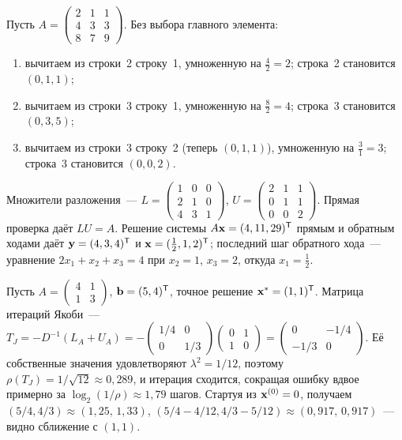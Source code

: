 \begin{example}
\label{ex:lu-3x3}
Пусть
$A = \begin{pmatrix} 2 & 1 & 1 \\ 4 & 3 & 3 \\ 8 & 7 & 9 \end{pmatrix}$.
Без выбора главного элемента:
\begin{enumerate}[label=(\arabic*)]
  \item вычитаем из строки~2 строку~1, умноженную на $\tfrac{4}{2} = 2$;
        строка~2 становится $(0, 1, 1)$;
  \item вычитаем из строки~3 строку~1, умноженную на $\tfrac{8}{2} = 4$;
        строка~3 становится $(0, 3, 5)$;
  \item вычитаем из строки~3 строку~2 (теперь $(0, 1, 1)$), умноженную
        на $\tfrac{3}{1} = 3$; строка~3 становится $(0, 0, 2)$.
\end{enumerate}
Множители разложения~---
$L = \begin{pmatrix} 1 & 0 & 0 \\ 2 & 1 & 0 \\ 4 & 3 & 1 \end{pmatrix}$,
$U = \begin{pmatrix} 2 & 1 & 1 \\ 0 & 1 & 1 \\ 0 & 0 & 2 \end{pmatrix}$.
Прямая проверка даёт $LU = A$. Решение системы
$A \mathbf{x} = (4, 11, 29)^{\mathsf{T}}$ прямым и обратным ходами даёт
$\mathbf{y} = (4, 3, 4)^{\mathsf{T}}$ и $\mathbf{x} = (\tfrac{1}{2}, 1, 2)^{\mathsf{T}}$;
последний шаг обратного хода~--- уравнение
$2 x_1 + x_2 + x_3 = 4$ при $x_2 = 1$, $x_3 = 2$, откуда
$x_1 = \tfrac{1}{2}$.
\end{example}

\begin{example}
\label{ex:jacobi}
Пусть $A = \begin{pmatrix} 4 & 1 \\ 1 & 3 \end{pmatrix}$,
$\mathbf{b} = (5, 4)^{\mathsf{T}}$, точное решение $\mathbf{x}^* = (1, 1)^{\mathsf{T}}$. Матрица
итераций Якоби~---
$T_J = -D^{-1}(L_A + U_A) = -\begin{pmatrix} 1/4 & 0 \\ 0 & 1/3 \end{pmatrix}\begin{pmatrix} 0 & 1 \\ 1 & 0 \end{pmatrix} = \begin{pmatrix} 0 & -1/4 \\ -1/3 & 0 \end{pmatrix}$.
Её собственные значения удовлетворяют $\lambda^2 = 1/12$, поэтому
$\rho(T_J) = 1/\sqrt{12} \approx 0{,}289$, и итерация сходится,
сокращая ошибку вдвое примерно за $\log_2(1/\rho) \approx 1{,}79$
шагов. Стартуя из $\mathbf{x}^{(0)} = 0$, получаем
$(5/4, 4/3) \approx (1{,}25,\, 1{,}33)$,
$(5/4 - 4/12, 4/3 - 5/12) \approx (0{,}917,\, 0{,}917)$~--- видно
сближение с $(1, 1)$.
\end{example}

